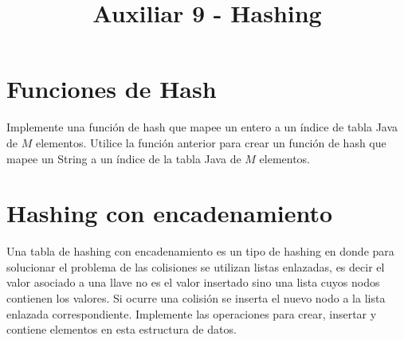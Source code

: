 \documentclass[dcc,sol]{fcfmcourse}
\title{Auxiliar 9 - Hashing}
\begin{document}
\maketitle

\vspace{-1ex}

\section*{Funciones de Hash}
\begin{problems}
\problem Implemente una función de hash que mapee un entero a un índice de tabla Java de $M$ elementos.
\problem Utilice la función anterior para crear un función de hash que mapee un String a un índice de la tabla Java de $M$ elementos.
\end{problems}

\section*{Hashing con encadenamiento}
\begin{problems}
\problem Una tabla de hashing con encadenamiento es un tipo de hashing en donde para solucionar el problema de las colisiones se utilizan listas enlazadas, es decir el valor asociado a una llave no es el valor insertado sino una lista cuyos nodos contienen los valores. Si ocurre una colisión se inserta el nuevo nodo a la lista enlazada correspondiente. Implemente las operaciones para crear, insertar y contiene elementos en esta estructura de datos.
\end{problems}
\end{document}
